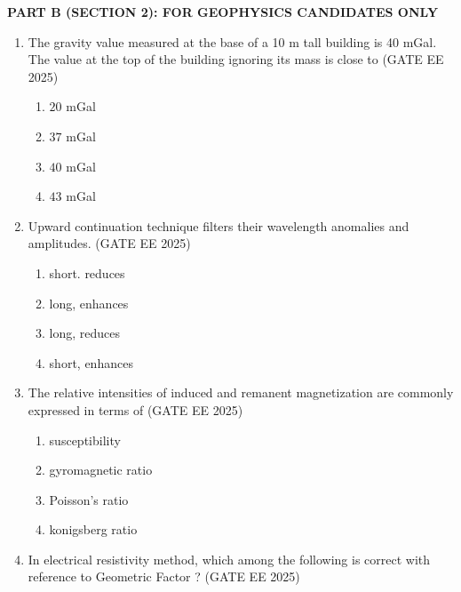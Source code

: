 \documentclass[journal]{IEEEtran}
\begin{document}
\vspace{1cm}
\textbf{PART B (SECTION 2): FOR GEOPHYSICS CANDIDATES ONLY}
\begin{enumerate}[start=26]
    \item The gravity value measured at the base of a 10 m tall building is 40 mGal. The value at the top of the building ignoring its mass is close to
\hfill{(GATE EE 2025)}
\begin{enumerate}
    \item $20$ mGal
\item  $37$ mGal
\item $40$ mGal
\item $43$ mGal
\end{enumerate}
\item Upward continuation technique filters their wavelength anomalies and amplitudes.
\hfill{(GATE EE 2025)}
\begin{enumerate}
    \item short. reduces

\item long, enhances

\item long, reduces
\item  short, enhances
\end{enumerate}

\item The relative intensities of induced and remanent magnetization are commonly expressed in terms of
\hfill{(GATE EE 2025)}
\begin{enumerate}
    \item  susceptibility

\item  gyromagnetic ratio

\item  Poisson's ratio

\item konigsberg ratio
 
\end{enumerate}
\item  In electrical resistivity method, which among the following is correct with reference to Geometric Factor ?
\hfill{(GATE EE 2025)}
\begin{enumerate}
\end{enumerate}
\end{enumerate}
\end{document}
